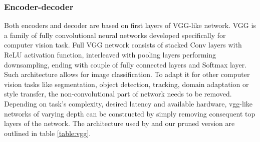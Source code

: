 \documentclass[../Main.tex]{subfiles}
\begin{document}
    \subsubsection{Encoder-decoder}
    Both encoders and decoder are based on first layers of VGG-like \cite{vgg}
    network. VGG is a family of fully convolutional neural networks developed 
    specifically for computer vision task. Full VGG network consists of
    stacked Conv layers with ReLU activation function, interleaved with pooling
    layers performing downsampling, ending with couple of fully
    connected layers and Softmax layer. Such architecture allows for image classification.
    To adapt it for other computer vision tasks like segmentation, object detection,
    tracking, domain adaptation or style transfer, the non-convolutional part
    of network needs to be removed. Depending on task's complexity, desired
    latency and available hardware, vgg-like networks of varying depth can be 
    constructed by simply removing consequent top layers of the network.
    The architecture used by \cite{Li2018} and our pruned version are 
    outlined in table \ref{table:vgg}. 
    
\end{document}
